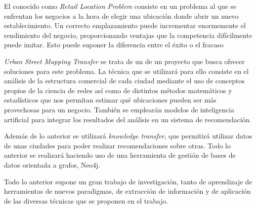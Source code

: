 

El conocido como \textit{Retail Location Problem} consiste en un problema al que se enfrentan los negocios a la hora de elegir una ubicación donde abrir un nuevo establecimiento. Un correcto emplazamiento puede incrementar enormemente el rendimiento del negocio, proporcionando ventajas que la competencia difícilmente puede imitar. Esto puede suponer la diferencia entre el éxito o el fracaso 

\textit{Urban Street Mapping Transfer} se trata de un de un proyecto que busca ofrecer soluciones para este problema. La técnica que se utilizará para ello consiste en el análisis de la estructura comercial de cada ciudad mediante el uso de conceptos propios de la ciencia de redes así como de distintos métodos matemáticos y estadísticos que nos permitan estimar qué ubicaciones pueden ser más provechosas para un negocio. También se emplearán modelos de inteligencia artificial para integrar los resultados del análisis en un sistema de recomendación.

Además de lo anterior se utilizará \textit{knowledge transfer}, que permitirá utilizar datos de unas ciudades para poder realizar recomendaciones sobre otras. Todo lo anterior se realizará haciendo uso de una herramienta de gestión de bases de datos orientada a grafos, Neo4j.

Todo lo anterior supone un gran trabajo de investigación, tanto de aprendizaje de herramientas de nuevos paradigmas, de extracción de información y de aplicación de las diversas técnicas que se proponen en el trabajo. 
